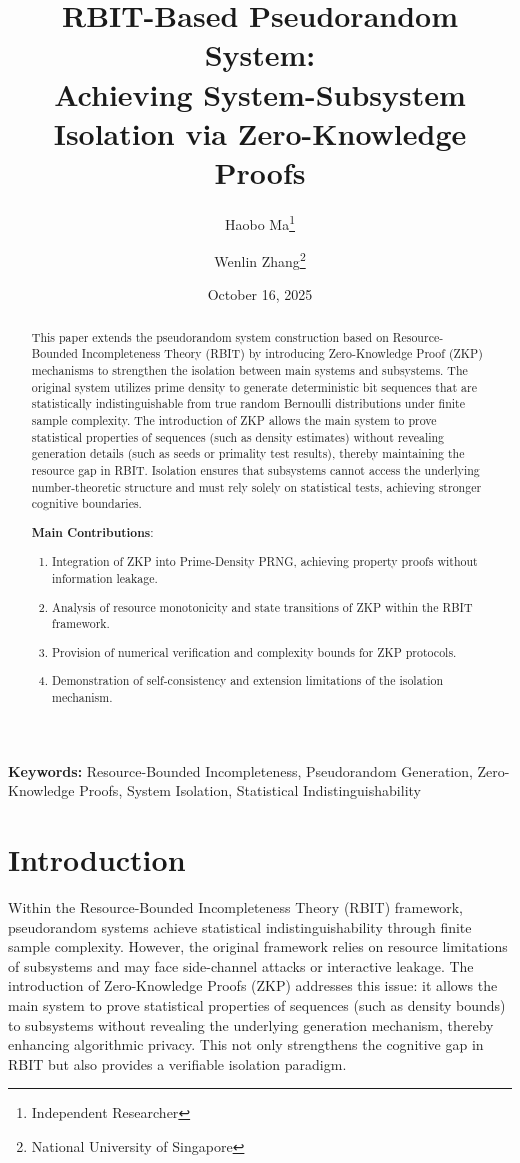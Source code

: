 \documentclass[12pt]{article}
\title{RBIT-Based Pseudorandom System: \\
Achieving System-Subsystem Isolation via Zero-Knowledge Proofs}
\author{Haobo Ma\thanks{Independent Researcher} \and Wenlin Zhang\thanks{National University of Singapore}}
\date{October 16, 2025}
\theoremstyle{plain}
\theoremstyle{definition}
\begin{document}
\maketitle

\begin{abstract}
This paper extends the pseudorandom system construction based on Resource-Bounded Incompleteness Theory (RBIT) by introducing Zero-Knowledge Proof (ZKP) mechanisms to strengthen the isolation between main systems and subsystems. The original system utilizes prime density to generate deterministic bit sequences that are statistically indistinguishable from true random Bernoulli distributions under finite sample complexity. The introduction of ZKP allows the main system to prove statistical properties of sequences (such as density estimates) without revealing generation details (such as seeds or primality test results), thereby maintaining the resource gap in RBIT. Isolation ensures that subsystems cannot access the underlying number-theoretic structure and must rely solely on statistical tests, achieving stronger cognitive boundaries.

\textbf{Main Contributions}:
\begin{enumerate}
\item Integration of ZKP into Prime-Density PRNG, achieving property proofs without information leakage.
\item Analysis of resource monotonicity and state transitions of ZKP within the RBIT framework.
\item Provision of numerical verification and complexity bounds for ZKP protocols.
\item Demonstration of self-consistency and extension limitations of the isolation mechanism.
\end{enumerate}
\end{abstract}

\noindent\textbf{Keywords:} Resource-Bounded Incompleteness, Pseudorandom Generation, Zero-Knowledge Proofs, System Isolation, Statistical Indistinguishability

\section{Introduction}

Within the Resource-Bounded Incompleteness Theory (RBIT) framework, pseudorandom systems achieve statistical indistinguishability through finite sample complexity. However, the original framework relies on resource limitations of subsystems and may face side-channel attacks or interactive leakage. The introduction of Zero-Knowledge Proofs (ZKP) addresses this issue: it allows the main system to prove statistical properties of sequences (such as density bounds) to subsystems without revealing the underlying generation mechanism, thereby enhancing algorithmic privacy. This not only strengthens the cognitive gap in RBIT but also provides a verifiable isolation paradigm.
\end{document}
